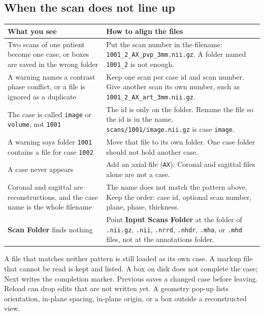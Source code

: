 \documentclass[10pt,a4paper]{article}
\begin{document}
\subsection*{When the scan does not line up}
\begin{center}
\small
\renewcommand{\arraystretch}{1.12}
\begin{tabular}{@{}p{}p{}@{}}
\toprule
\textbf{What you see} & \textbf{How to align the files} \\
\midrule
Two scans of one patient become one case, or boxes are saved in the wrong folder &
Put the scan number in the filename: \texttt{1001\_2\_AX\_pvp\_3mm.nii.gz}. A folder named \texttt{1001\_2} is not enough. \\
A warning names a contrast phase conflict, or a file is ignored as a duplicate &
Keep one scan per case id and scan number. Give another scan its own number, such as \texttt{1001\_2\_AX\_art\_3mm.nii.gz}. \\
The case is called \texttt{image} or \texttt{volume}, not \texttt{1001} &
The id is only on the folder. Rename the file so the id is in the name. \texttt{scans/1001/image.nii.gz} is case \texttt{image}. \\
A warning says folder \texttt{1001} contains a file for case \texttt{1002} &
Move that file to its own folder. One case folder should not hold another case. \\
A case never appears &
Add an axial file (\texttt{AX}). Coronal and sagittal files alone are not a case. \\
Coronal and sagittal are reconstructions, and the case name is the whole filename &
The name does not match the pattern above. Keep the order: case id, optional scan number, plane, phase, thickness. \\
\textbf{Scan Folder} finds nothing &
Point \textbf{Input Scans Folder} at the folder of \texttt{.nii.gz}, \texttt{.nii}, \texttt{.nrrd}, \texttt{.nhdr}, \texttt{.mha}, or \texttt{.mhd} files, not at the annotations folder. \\
\bottomrule
\end{tabular}
\end{center}

\vspace{0.15cm}
{\footnotesize\color{gray} A file that matches neither pattern is still loaded as its own case. A markup file that cannot be read is kept and listed. A box on disk does not complete the case; Next writes the completion marker. Previous saves a changed case before leaving. Reload can drop edits that are not written yet. A geometry pop-up lists orientation, in-plane spacing, in-plane origin, or a box outside a reconstructed view.}
\end{document}

